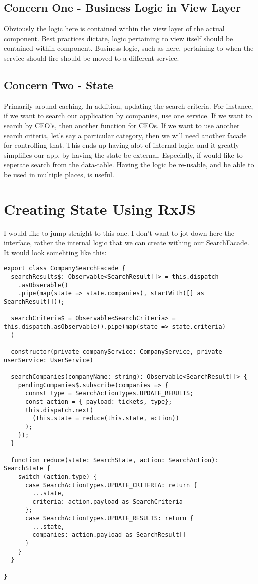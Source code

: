 \subsection{Concern One - Business Logic in View Layer}
Obviously the logic here is contained within the view layer of the actual component. Best practices dictate, logic pertaining to view itself should be contained within component. Business logic, such as here, pertaining to when the service should fire should be moved to a different service. 

\subsection{Concern Two - State }
Primarily around caching. In addition, updating the search criteria. For instance, if we want to search our application by companies, use one service. If we want to search by CEO's, then another function for CEOs. If we want to use another search criteria, let's say a particular category, then we will need another facade for controlling that. This ends up having alot of internal logic, and it greatly simplifies our app, by having the state be external. Especially, if would like to seperate search from the data-table. Having the logic be re-usable, and be able to be used in multiple places, is useful.

\section{Creating State Using RxJS}
I would like to jump straight to this one. I don't want to jot down here the interface, rather the internal logic that we can create withing our SearchFacade. It would look somehting like this:  

\begin{lstlisting}[caption=company-search.facade.ts]
export class CompanySearchFacade {
  searchResults$: Observable<SearchResult[]> = this.dispatch
    .asObserable() 
    .pipe(map(state => state.companies), startWith([] as SearchResult[]));

  searchCriteria$ = Observable<SearchCriteria> = this.dispatch.asObservable().pipe(map(state => state.criteria)
  ) 

  constructor(private companyService: CompanyService, private userService: UserService)
    
  searchCompanies(companyName: string): Observable<SearchResult[]> {
    pendingCompanies$.subscribe(companies => {
      connst type = SearchActionTypes.UPDATE_RERULTS;
      const action = { payload: tickets, type};
      this.dispatch.next(
        (this.state = reduce(this.state, action))
      );
    });
  }

  function reduce(state: SearchState, action: SearchAction): SearchState {
    switch (action.type) {
      case SearchActionTypes.UPDATE_CRITERIA: return {
        ...state,
        criteria: action.payload as SearchCriteria
      };
      case SearchActionTypes.UPDATE_RESULTS: return {
        ...state,
        companies: action.payload as SearchResult[]
      }
    }
  }

}  
\end{lstlisting} 
